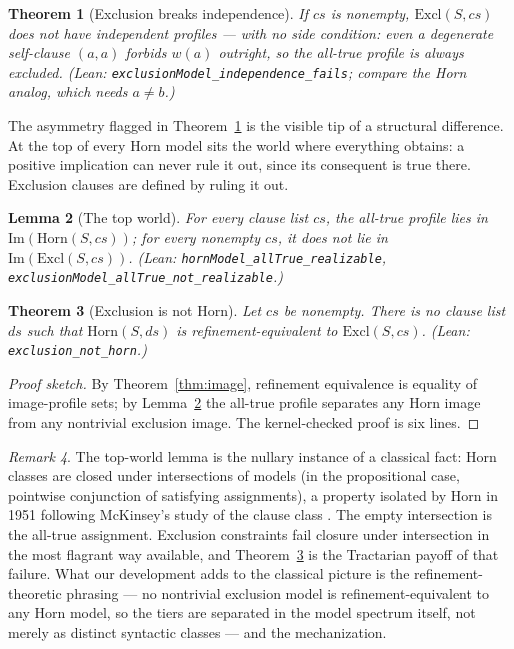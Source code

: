 \documentclass[10pt, letterpaper]{article}
\newtheorem{theorem}{Theorem}[section]
\newtheorem{lemma}[theorem]{Lemma}
\theoremstyle{remark}
\newtheorem{remark}[theorem]{Remark}
\newcommand{\lean}[1]{\texttt{#1}}
\begin{document}
\begin{theorem}[Exclusion breaks independence]\label{thm:excl-indep}
If $\mathit{cs}$ is nonempty, $\mathrm{Excl}(S, \mathit{cs})$ does not have
independent profiles --- with no side condition: even a degenerate
self-clause $(a, a)$ forbids $w(a)$ outright, so the all-true profile is
always excluded. (Lean: \lean{exclusionModel\_independence\_fails}; compare
the Horn analog, which needs $a \neq b$.)
\end{theorem}

The asymmetry flagged in Theorem~\ref{thm:excl-indep} is the visible tip of
a structural difference. At the top of every Horn model sits the world where
everything obtains: a positive implication can never rule it out, since its
consequent is true there. Exclusion clauses are defined by ruling it out.

\begin{lemma}[The top world]\label{lem:top}
For every clause list $\mathit{cs}$, the all-true profile lies in
$\mathrm{Im}(\mathrm{Horn}(S, \mathit{cs}))$; for every \emph{nonempty}
$\mathit{cs}$, it does not lie in $\mathrm{Im}(\mathrm{Excl}(S, \mathit{cs}))$.
(Lean: \lean{hornModel\_allTrue\_realizable},
\lean{exclusionModel\_allTrue\_not\_realizable}.)
\end{lemma}

\begin{theorem}[Exclusion is not Horn]\label{thm:exclusion-not-horn}
Let $\mathit{cs}$ be nonempty. There is no clause list $\mathit{ds}$ such
that $\mathrm{Horn}(S, \mathit{ds})$ is refinement-equivalent to
$\mathrm{Excl}(S, \mathit{cs})$. (Lean: \lean{exclusion\_not\_horn}.)
\end{theorem}

\begin{proof}[Proof sketch]
By Theorem~\ref{thm:image}, refinement equivalence is equality of
image-profile sets; by Lemma~\ref{lem:top} the all-true profile separates
any Horn image from any nontrivial exclusion image. The kernel-checked proof
is six lines. \end{proof}

\begin{remark}\label{rem:horn1951}
The top-world lemma is the nullary instance of a classical fact: Horn classes
are closed under intersections of models (in the propositional case,
pointwise conjunction of satisfying assignments), a property isolated by Horn
in 1951 \cite{horn1951} following McKinsey's study of the clause class
\cite{mckinsey1943}. The empty intersection is the all-true assignment.
Exclusion constraints fail closure under intersection in the most flagrant
way available, and Theorem~\ref{thm:exclusion-not-horn} is the Tractarian
payoff of that failure. What our development adds to the classical picture is
the refinement-theoretic phrasing --- no nontrivial exclusion model is
refinement-equivalent to any Horn model, so the tiers are separated in the
model spectrum itself, not merely as distinct syntactic classes --- and the
mechanization.
\end{remark}
\end{document}
